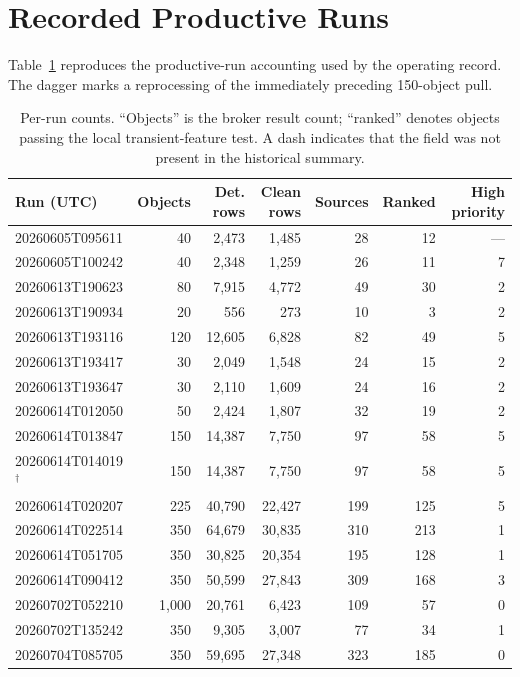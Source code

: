 \documentclass[11pt]{article}
\begin{document}
\appendix

\section{Recorded Productive Runs}
\label{app:runs}

Table~\ref{tab:runs} reproduces the productive-run accounting used by the operating record. The dagger marks a reprocessing of the immediately preceding 150-object pull.

\begin{table}[ht]
\centering
\scriptsize
\caption{Per-run counts. ``Objects'' is the broker result count; ``ranked'' denotes objects passing the local transient-feature test. A dash indicates that the field was not present in the historical summary.}
\label{tab:runs}
\begin{tabular}{lrrrrrr}
\toprule
Run (UTC) & Objects & Det. rows & Clean rows & Sources & Ranked & High priority \\
\midrule
20260605T095611 & 40 & 2,473 & 1,485 & 28 & 12 & --- \\
20260605T100242 & 40 & 2,348 & 1,259 & 26 & 11 & 7 \\
20260613T190623 & 80 & 7,915 & 4,772 & 49 & 30 & 2 \\
20260613T190934 & 20 & 556 & 273 & 10 & 3 & 2 \\
20260613T193116 & 120 & 12,605 & 6,828 & 82 & 49 & 5 \\
20260613T193417 & 30 & 2,049 & 1,548 & 24 & 15 & 2 \\
20260613T193647 & 30 & 2,110 & 1,609 & 24 & 16 & 2 \\
20260614T012050 & 50 & 2,424 & 1,807 & 32 & 19 & 2 \\
20260614T013847 & 150 & 14,387 & 7,750 & 97 & 58 & 5 \\
20260614T014019$^\dagger$ & 150 & 14,387 & 7,750 & 97 & 58 & 5 \\
20260614T020207 & 225 & 40,790 & 22,427 & 199 & 125 & 5 \\
20260614T022514 & 350 & 64,679 & 30,835 & 310 & 213 & 1 \\
20260614T051705 & 350 & 30,825 & 20,354 & 195 & 128 & 1 \\
20260614T090412 & 350 & 50,599 & 27,843 & 309 & 168 & 3 \\
20260702T052210 & 1,000 & 20,761 & 6,423 & 109 & 57 & 0 \\
20260702T135242 & 350 & 9,305 & 3,007 & 77 & 34 & 1 \\
20260704T085705 & 350 & 59,695 & 27,348 & 323 & 185 & 0 \\

\end{tabular}
\end{table}
\end{document}
